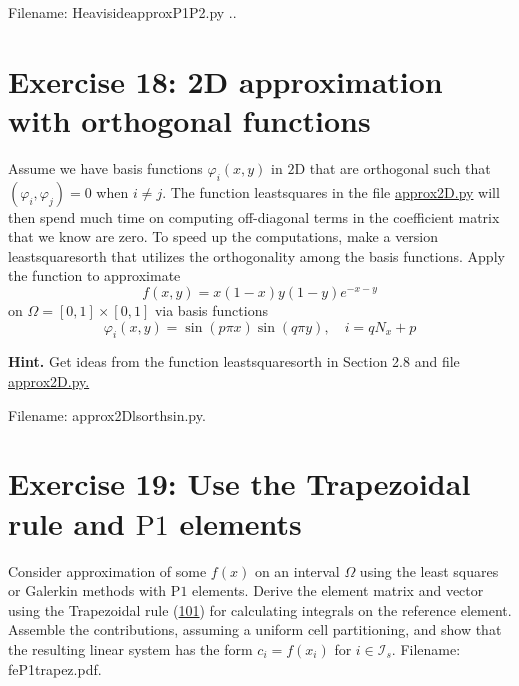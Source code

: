 \documentclass[../main.tex]{subfiles}
\begin{document}
Filename: Heaviside\textunderscore approx\textunderscore P1P2.py ..
\bigbreak
\section*{Exercise 18: 2D approximation with orthogonal functions}
\label{sec:sec_10_18}
\noindent Assume we have basis functions $\varphi_{i}(x, y)$ in $2 \mathrm{D}$ that are orthogonal such that $\left(\varphi_{i}, \varphi_{j}\right)=0$ when $i \neq j$. The function least\textunderscore squares in the file \href{http://tinyurl.com/jvzzcfn/fem/fe_approx2D.py}{approx2D.py} will then spend much time on computing off-diagonal terms in the coefficient matrix that we know are zero. To speed up the computations, make a version least\textunderscore squares\textunderscore orth that utilizes the orthogonality among the basis functions. Apply the function to approximate
$$
f(x, y)=x(1-x) y(1-y) e^{-x-y}
$$
on $\Omega=[0,1] \times[0,1]$ via basis functions
$$
\varphi_{i}(x, y)=\sin (p \pi x) \sin (q \pi y), \quad i=q N_{x}+p
$$

\noindent \textbf{Hint.} Get ideas from the function least\textunderscore squares\textunderscore orth in Section 2.8 and
file \href{http://tinyurl.com/jvzzcfn/fem/fe_approx2D.py}{approx2D.py.}

Filename: approx2D\textunderscore lsorth\textunderscore sin.py.
\bigbreak
\section*{Exercise 19: Use the Trapezoidal rule and $\mathrm{P} 1$ elements}
\label{sec:sec_10_19}
\noindent Consider approximation of some $f(x)$ on an interval $\Omega$ using the least squares or Galerkin methods with $\mathrm{P} 1$ elements. Derive the element matrix and vector using the Trapezoidal rule (\hyperref[eqa101]{101}) for calculating integrals on the reference element. Assemble the contributions, assuming a uniform cell partitioning, and show that the resulting linear system has the form $c_{i}=f\left(x_{i}\right)$ for $i \in \mathcal{I}_{s}$. Filename: fe\textunderscore P1\textunderscore trapez.pdf.
\bigbreak
\end{document}
